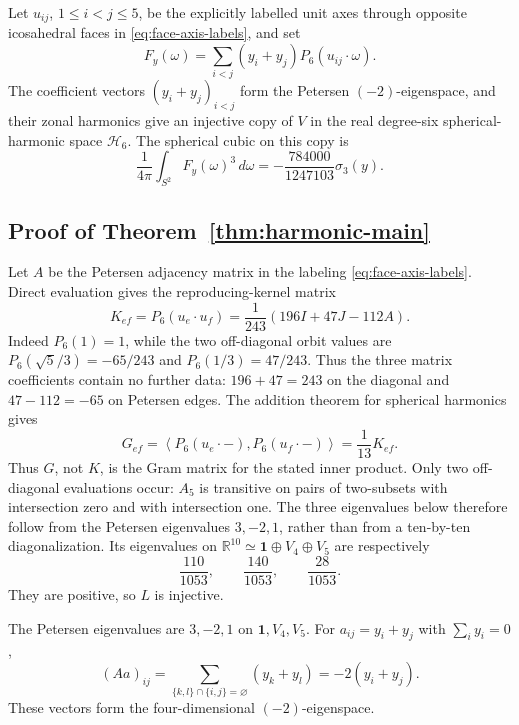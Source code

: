 \begin{theorem}
\label{thm:harmonic-main}
Let \(u_{ij}\), \(1\leq i<j\leq5\), be the explicitly labelled unit axes
through opposite icosahedral faces in \eqref{eq:face-axis-labels}, and set
\[
 F_y(\omega)=\sum_{i<j}(y_i+y_j)P_6(u_{ij}\mathbin{\cdot}\omega).
\]
The coefficient vectors \((y_i+y_j)_{i<j}\) form the Petersen
\((-2)\)-eigenspace, and their zonal harmonics give an injective copy of
\(V\) in the real degree-six spherical-harmonic space \(\mathcal H_6\).
The spherical cubic on this copy is
\[
 \frac1{4\pi}\int_{S^2}F_y(\omega)^3\,d\omega
 =-\frac{784000}{1247103}\sigma_3(y).
\]
\end{theorem}

\subsection{Proof of Theorem~\ref{thm:harmonic-main}}

Let \(A\) be the Petersen adjacency matrix in the labeling
\eqref{eq:face-axis-labels}.  Direct evaluation gives the reproducing-kernel
matrix
\[
 K_{ef}=P_6(u_e\cdot u_f)
 =\frac1{243}(196I+47J-112A).
\]
Indeed \(P_6(1)=1\), while the two off-diagonal orbit values are
\(P_6(\sqrt5/3)=-65/243\) and \(P_6(1/3)=47/243\).
Thus the three matrix coefficients contain no further data:
\(196+47=243\) on the diagonal and \(47-112=-65\) on Petersen edges.
The addition theorem for spherical harmonics gives
\[
 G_{ef}
 =\left\langle P_6(u_e\cdot-),P_6(u_f\cdot-)\right\rangle
 =\frac1{13}K_{ef}.
\]
Thus \(G\), not \(K\), is the Gram matrix for the stated inner product.
Only two off-diagonal evaluations occur: \(A_5\) is transitive on pairs of
two-subsets with intersection zero and with intersection one.  The three
eigenvalues below therefore follow from the Petersen eigenvalues
\(3,-2,1\), rather than from a ten-by-ten diagonalization.
Its eigenvalues on
\(\mathbb R^{10}\simeq\mathbf1\oplus V_4\oplus V_5\) are respectively
\[
 \frac{110}{1053},\qquad
 \frac{140}{1053},\qquad
 \frac{28}{1053}.
\]
They are positive, so \(L\) is injective.

The Petersen eigenvalues are \(3,-2,1\) on
\(\mathbf1,V_4,V_5\).  For \(a_{ij}=y_i+y_j\) with \(\sum_i y_i=0\),
\[
 (Aa)_{ij}
 =
 \sum_{\{k,l\}\cap\{i,j\}=\varnothing}(y_k+y_l)
 =-2(y_i+y_j).
\]
These vectors form the four-dimensional \((-2)\)-eigenspace.

